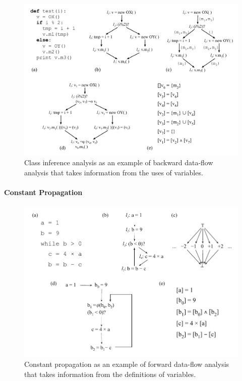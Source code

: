 \begin{figure}[t!]
\centering
\includegraphics[width=\linewidth]{classInference}
\caption{Class inference analysis as an example of backward data-flow analysis that takes information from the uses of variables.}
\label{fig:classInference}
\end{figure}

\paragraph{Constant Propagation}

\begin{figure}[t!]
\centering
\includegraphics[width=\linewidth]{ConstPropSsaBook}
\caption{Constant propagation as an example of forward data-flow analysis that takes information from the definitions of variables.}
\label{fig:constantProp}
\end{figure}

